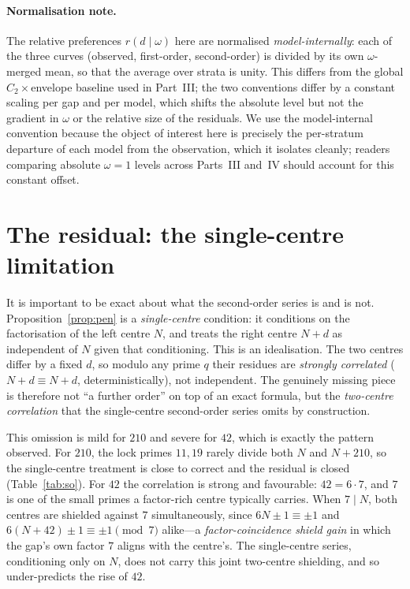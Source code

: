 \documentclass[11pt]{article}
\begin{document}
\paragraph{Normalisation note.}
The relative preferences $r(d\mid\omega)$ here are normalised \emph{model-internally}:
each of the three curves (observed, first-order, second-order) is divided by its
own $\omega$-merged mean, so that the average over strata is unity. This differs
from the global $C_2\times$envelope baseline used in Part~III; the two
conventions differ by a constant scaling per gap and per model, which shifts the
absolute level but not the gradient in $\omega$ or the relative size of the
residuals. We use the model-internal convention because the object of interest
here is precisely the per-stratum departure of each model from the observation,
which it isolates cleanly; readers comparing absolute $\omega=1$ levels across
Parts~III and~IV should account for this constant offset.

\section{The residual: the single-centre limitation}

It is important to be exact about what the second-order series is and is not.
Proposition~\ref{prop:pen} is a \emph{single-centre} condition: it conditions on
the factorisation of the left centre $N$, and treats the right centre $N+d$ as
independent of $N$ given that conditioning. This is an idealisation. The two
centres differ by a fixed $d$, so modulo any prime $q$ their residues are
\emph{strongly correlated} ($N+d\equiv N+d$, deterministically), not
independent. The genuinely missing piece is therefore not ``a further order'' on
top of an exact formula, but the \emph{two-centre correlation} that the
single-centre second-order series omits by construction.

This omission is mild for $210$ and severe for $42$, which is exactly the pattern
observed. For $210$, the lock primes $11,19$ rarely divide both $N$ and $N+210$,
so the single-centre treatment is close to correct and the residual is closed
(Table~\ref{tab:so}). For $42$ the correlation is strong and favourable: $42=6
\cdot7$, and $7$ is one of the small primes a factor-rich centre typically
carries. When $7\mid N$, both centres are shielded against $7$ simultaneously,
since $6N\pm1\equiv\pm1$ and $6(N+42)\pm1\equiv\pm1\pmod 7$ alike---a
\emph{factor-coincidence shield gain} in which the gap's own factor $7$ aligns
with the centre's. The single-centre series, conditioning only on $N$, does not
carry this joint two-centre shielding, and so under-predicts the rise of $42$.
\end{document}
